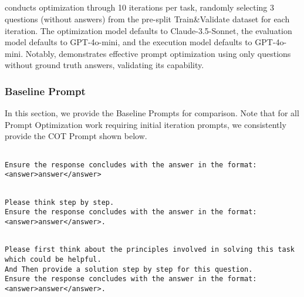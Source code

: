 \subparagraph{\ours}
\ours conducts optimization through 10 iterations per task, randomly selecting 3 questions (without answers) from the pre-split Train\&Validate dataset for each iteration. The optimization model defaults to Claude-3.5-Sonnet, the evaluation model defaults to GPT-4o-mini, and the execution model defaults to GPT-4o-mini. Notably, \ours demonstrates effective prompt optimization using only questions without ground truth answers, validating its capability.

\subsubsection{Baseline Prompt}


In this section, we provide the Baseline Prompts for comparison. Note that for all Prompt Optimization work requiring initial iteration prompts, we consistently provide the COT Prompt shown below.

\begin{tcolorbox}[title={\textbf{\small IO Prompt}}, boxrule=2pt, arc=0mm, breakable]
\begin{verbatim}

Ensure the response concludes with the answer in the format: 
<answer>answer</answer>

\end{verbatim}
\end{tcolorbox}

\begin{tcolorbox}[title={\textbf{\small COT Prompt}}, boxrule=2pt, arc=0mm, breakable]
\begin{verbatim}

Please think step by step.
Ensure the response concludes with the answer in the format:
<answer>answer</answer>.

\end{verbatim}
\end{tcolorbox}

\begin{tcolorbox}[title={\textbf{\small Step-back Prompt}}, boxrule=2pt, arc=0mm, breakable]
\begin{verbatim}

Please first think about the principles involved in solving this task which could be helpful.
And Then provide a solution step by step for this question.
Ensure the response concludes with the answer in the format:
<answer>answer</answer>.

\end{verbatim}
\end{tcolorbox}

